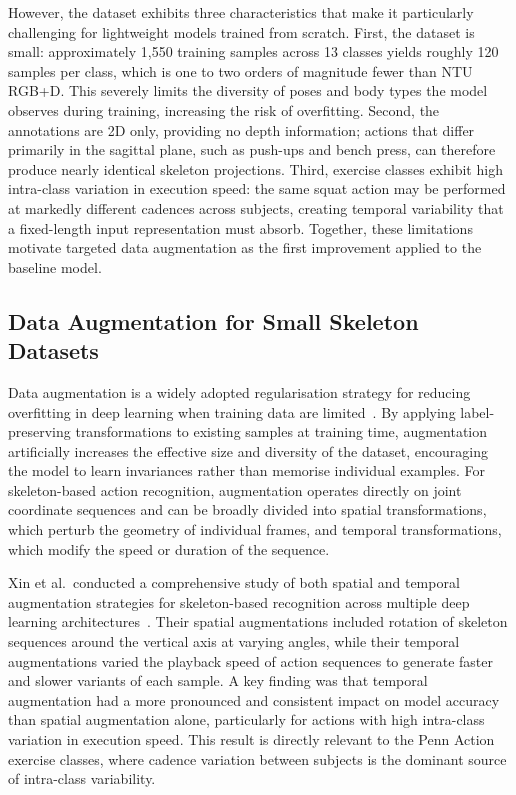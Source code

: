 However, the dataset exhibits three characteristics that make it particularly challenging for lightweight models trained from scratch. First, the dataset is small: approximately 1,550 training samples across 13 classes yields roughly 120 samples per class, which is one to two orders of magnitude fewer than NTU RGB+D. This severely limits the diversity of poses and body types the model observes during training, increasing the risk of overfitting. Second, the annotations are 2D only, providing no depth information; actions that differ primarily in the sagittal plane, such as push-ups and bench press, can therefore produce nearly identical skeleton projections. Third, exercise classes exhibit high intra-class variation in execution speed: the same squat action may be performed at markedly different cadences across subjects, creating temporal variability that a fixed-length input representation must absorb. Together, these limitations motivate targeted data augmentation as the first improvement applied to the baseline model.

\subsection{Data Augmentation for Small Skeleton Datasets}
Data augmentation is a widely adopted regularisation strategy for reducing overfitting in deep learning when training data are limited~\cite{shorten2019survey}. By applying label-preserving transformations to existing samples at training time, augmentation artificially increases the effective size and diversity of the dataset, encouraging the model to learn invariances rather than memorise individual examples. For skeleton-based action recognition, augmentation operates directly on joint coordinate sequences and can be broadly divided into spatial transformations, which perturb the geometry of individual frames, and temporal transformations, which modify the speed or duration of the sequence.

Xin et al.\ conducted a comprehensive study of both spatial and temporal augmentation strategies for skeleton-based recognition across multiple deep learning architectures~\cite{xin2024enhancing}. Their spatial augmentations included rotation of skeleton sequences around the vertical axis at varying angles, while their temporal augmentations varied the playback speed of action sequences to generate faster and slower variants of each sample. A key finding was that temporal augmentation had a more pronounced and consistent impact on model accuracy than spatial augmentation alone, particularly for actions with high intra-class variation in execution speed. This result is directly relevant to the Penn Action exercise classes, where cadence variation between subjects is the dominant source of intra-class variability.

